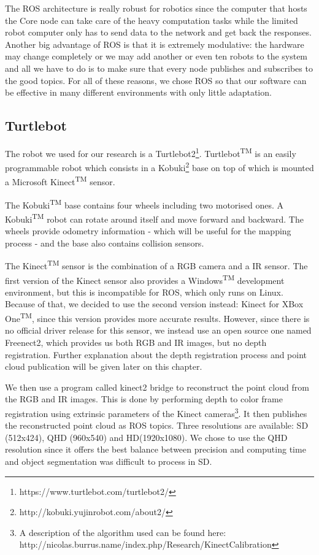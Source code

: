 The ROS architecture is really robust for robotics since the computer that hosts the Core node can take care of the heavy computation tasks while the limited robot computer only has to send data to the network and get back the responses. Another big advantage of ROS is that it is extremely modulative: the hardware may change completely or we may add another or even ten robots to the system and all we have to do is to make sure that every node publishes and subscribes to the good topics. For all of these reasons, we chose ROS so that our software can be effective in many different environments with only little adaptation.

\subsection{Turtlebot}
The robot we used for our research is a Turtlebot2\footnote{https://www.turtlebot.com/turtlebot2/}. Turtlebot\textsuperscript{TM} is an easily programmable robot which consists in a Kobuki\footnote{http://kobuki.yujinrobot.com/about2/} base on top of which is mounted a Microsoft Kinect\textsuperscript{TM} sensor. 

The Kobuki\textsuperscript{TM} base contains four wheels including two motorised ones. A Kobuki\textsuperscript{TM} robot can rotate around itself and move forward and backward. The wheels provide odometry information - which will be useful for the mapping process - and the base also contains collision sensors.

The Kinect\textsuperscript{TM} sensor is the combination of a RGB camera and a IR sensor. The first version of the Kinect sensor also provides a Windows\textsuperscript{TM} development environment, but this is incompatible for ROS, which only runs on Linux. Because of that, we decided to use the second version instead: Kinect for XBox One\textsuperscript{TM}, since this version provides more accurate results\cite{kinect_comparison}. However, since there is no official driver release for this sensor, we instead use an open source one named Freenect2\cite{libfreenect2}, which provides us both RGB and IR images, but no depth registration. Further explanation about the depth registration process and point cloud publication will be given later on this chapter.

We then use a program called kinect2 bridge\cite{iai_kinect2} to reconstruct the point cloud from the RGB and IR images. This is done by performing depth to color frame registration using extrinsic parameters of the Kinect cameras\footnote{\raggedright A description of the algorithm used can be found here: http://nicolas.burrus.name/index.php/Research/KinectCalibration}.
It then publishes the reconstructed point cloud as ROS topics. Three resolutions are available: SD (512x424), QHD (960x540) and HD(1920x1080). We chose to use the QHD resolution since it offers the best balance between precision and computing time and object segmentation was difficult to process in SD.

